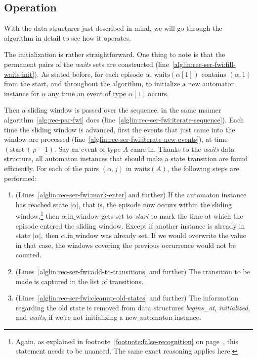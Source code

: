 \subsection{Operation}

With the data structures just described in mind, we will go through the algorithm in detail to see how it operates.

The initialization is rather straightforward. One thing to note is that the permanent pairs of the \emph{waits} sets are constructed (line~\ref{alglin:rec-ser-fwi:fill-waits-init}). As stated before, for each episode $ \alpha $, $ \text{waits}(\alpha[1]) $ contains $ (\alpha, 1) $ from the start, and throughout the algorithm, to initialize a new automaton instance for $ \alpha $ any time an event of type $ \alpha[1] $ occurs.

Then a sliding window is passed over the sequence, in the same manner algorithm~\ref{alg:rec-par-fwi} does (line~\ref{alglin:rec-ser-fwi:iterate-sequence}). Each time the sliding window is advanced, first the events that just came into the window are processed (line~\ref{alglin:rec-ser-fwi:iterate-new-events}), at time $ (\text{start} + \rho - 1) $. Say an event of type $ A $ came in. Thanks to the \emph{waits} data structure, all automaton instances that should make a state transition are found efficiently. For each of the pairs $ (\alpha, j) $ in $ \text{waits}(A) $, the following steps are performed:

\begin{enumerate}
\item (Lines~\ref{alglin:rec-ser-fwi:mark-enter} and further) If the automaton instance has reached state $ | \alpha | $, that is, the episode now occurs within the sliding window,\footnote{Again, as explained in footnote~\ref{footnote:false-recognition} on page~\pageref{footnote:false-recognition}, this statement needs to be nuanced. The same exact reasoning applies here.} then $ \alpha \text{.in\_window} $ gets set to \emph{start} to mark the time at which the episode entered the sliding window. Except if another instance is already in state $ | \alpha | $, then $ \alpha \text{.in\_window} $ was already set. If we would overwrite the value in that case, the windows covering the previous occurrence would not be counted.
\item (Lines~\ref{alglin:rec-ser-fwi:add-to-transitions} and further) The transition to be made is captured in the list of transitions.
\item (Lines~\ref{alglin:rec-ser-fwi:cleanup-old-states} and further) The information regarding the old state is removed from data structures \emph{begins\_at}, \emph{initialized}, and \emph{waits}, if we're not initializing a new automaton instance.
\end{enumerate}


